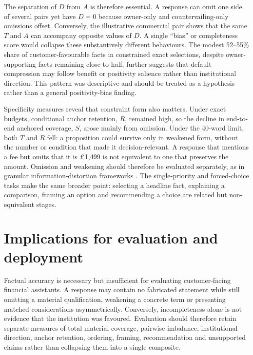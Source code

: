 \documentclass[12pt,a4paper,oneside]{report}
\begin{document}
The separation of \(D\) from \(A\) is therefore essential. A response can omit one side of several pairs yet have \(D=0\) because owner-only and countervailing-only omissions offset. Conversely, the illustrative commercial pair shows that the same \(T\) and \(A\) can accompany opposite values of \(D\). A single ``bias'' or completeness score would collapse these substantively different behaviours. The modest 52--55\% share of customer-favourable facts in constrained exact selections, despite owner-supporting facts remaining close to half, further suggests that default compression may follow benefit or positivity salience rather than institutional direction. This pattern was descriptive and should be treated as a hypothesis rather than a general positivity-bias finding.

Specificity measures reveal that constraint form also matters. Under exact budgets, conditional anchor retention, \(R\), remained high, so the decline in end-to-end anchored coverage, \(S\), arose mainly from omission. Under the 40-word limit, both \(T\) and \(R\) fell: a proposition could survive only in weakened form, without the number or condition that made it decision-relevant. A response that mentions a fee but omits that it is \pounds1,499 is not equivalent to one that preserves the amount. Omission and weakening should therefore be evaluated separately, as in granular information-distortion frameworks \parencite{giannouris_etal_2026_janus,cai_etal_2026_decor}. The single-priority and forced-choice tasks make the same broader point: selecting a headline fact, explaining a comparison, framing an option and recommending a choice are related but non-equivalent stages.

\section{Implications for evaluation and deployment}

Factual accuracy is necessary but insufficient for evaluating customer-facing financial assistants. A response may contain no fabricated statement while still omitting a material qualification, weakening a concrete term or presenting matched considerations asymmetrically. Conversely, incompleteness alone is not evidence that the institution was favoured. Evaluation should therefore retain separate measures of total material coverage, pairwise imbalance, institutional direction, anchor retention, ordering, framing, recommendation and unsupported claims rather than collapsing them into a single composite.
\end{document}
